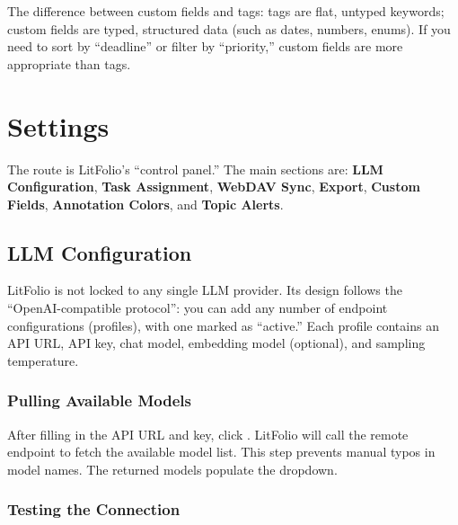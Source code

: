 \begin{tipbox}
The difference between custom fields and tags: tags are flat, untyped keywords; custom
fields are typed, structured data (such as dates, numbers, enums). If you need to sort
by ``deadline'' or filter by ``priority,'' custom fields are more appropriate than tags.
\end{tipbox}

\chapter{Settings}
\label{ch:settings}

The  route is LitFolio's ``control panel.'' The main sections are:
\textbf{LLM Configuration}, \textbf{Task Assignment}, \textbf{WebDAV Sync},
\textbf{Export}, \textbf{Custom Fields}, \textbf{Annotation Colors}, and
\textbf{Topic Alerts}.

\section{LLM Configuration}

LitFolio is not locked to any single LLM provider. Its design follows the ``OpenAI-compatible
protocol'': you can add any number of endpoint configurations (profiles), with one marked
as ``active.'' Each profile contains an API URL, API key, chat model, embedding model
(optional), and sampling temperature.


\subsection{Pulling Available Models}

After filling in the API URL and key, click . LitFolio will call the remote
 endpoint to fetch the available model list. This step prevents
manual typos in model names. The returned models populate the dropdown.

\subsection{Testing the Connection}

